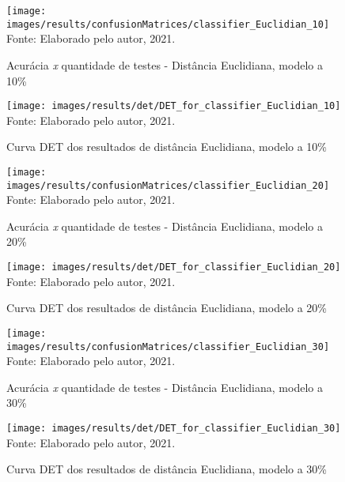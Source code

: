 			\FloatBarrier

			\begin{figure}[H]
				\centering
				\caption{Acurácia \textit{x} quantidade de testes - Distância Euclidiana, modelo a 10\%}
				\texttt{[image: images/results/confusionMatrices/classifier\_Euclidian\_10]}
				\label{fig:classifiereuclidian10}
				\\Fonte: Elaborado pelo autor, 2021.
			\end{figure}

			\begin{figure}[H]
				\centering
				\caption{Curva DET dos resultados de distância Euclidiana, modelo a 10\%}
				\texttt{[image: images/results/det/DET\_for\_classifier\_Euclidian\_10]}
				\label{fig:detforclassifiereuclidian10}
				\\Fonte: Elaborado pelo autor, 2021.
			\end{figure}
			
			\begin{figure}[H]
				\centering
				\caption{Acurácia \textit{x} quantidade de testes - Distância Euclidiana, modelo a 20\%}
				\texttt{[image: images/results/confusionMatrices/classifier\_Euclidian\_20]}
				\label{fig:classifiereuclidian20}
				\\Fonte: Elaborado pelo autor, 2021.
			\end{figure}
		
			\begin{figure}[H]
				\centering
				\caption{Curva DET dos resultados de distância Euclidiana, modelo a 20\%}
				\texttt{[image: images/results/det/DET\_for\_classifier\_Euclidian\_20]}
				\label{fig:detforclassifiereuclidian20}
				\\Fonte: Elaborado pelo autor, 2021.
			\end{figure}

			\begin{figure}[H]
				\centering
				\caption{Acurácia \textit{x} quantidade de testes - Distância Euclidiana, modelo a 30\%}
				\texttt{[image: images/results/confusionMatrices/classifier\_Euclidian\_30]}
				\label{fig:classifiereuclidian30}
				\\Fonte: Elaborado pelo autor, 2021.
			\end{figure}
		
			\begin{figure}[H]
				\centering
				\caption{Curva DET dos resultados de distância Euclidiana, modelo a 30\%}
				\texttt{[image: images/results/det/DET\_for\_classifier\_Euclidian\_30]}
				\label{fig:detforclassifiereuclidian30}
				\\Fonte: Elaborado pelo autor, 2021.
			\end{figure}
			
